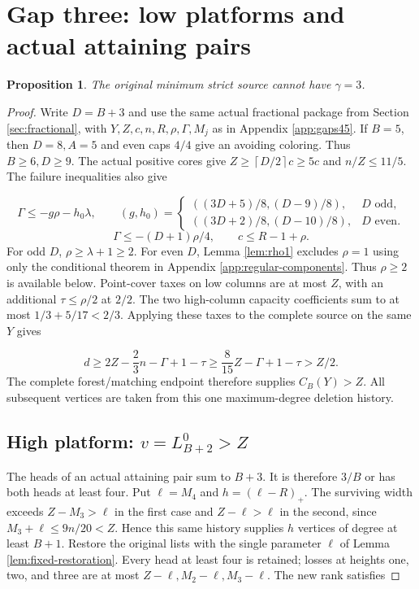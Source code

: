 \documentclass[11pt,a4paper]{article}
\newcommand{\ceil}[1]{\left\lceil#1\right\rceil}
\newtheorem{proposition}[theorem]{Proposition}
\theoremstyle{definition}
\begin{document}
\section{Gap three: low platforms and actual attaining pairs}\label{app:gap3}
\begin{proposition}\label{prop:gap3}
The original minimum strict source cannot have $\gamma=3$.
\end{proposition}
\begin{proof}
Write $D=B+3$ and use the same actual fractional package from
Section \ref{sec:fractional}, with $Y,Z,c,n,R,\rho,\Gamma,M_j$
as in Appendix \ref{app:gaps45}.
If $B=5$, then $D=8,A=5$ and even caps $4/4$ give an avoiding coloring.
Thus $B\ge6,D\ge9$.
The actual positive cores give $Z\ge\ceil{D/2}c\ge5c$ and $n/Z\le11/5$.
The failure inequalities also give

\begin{equation}\label{eq:gap3-debt}
\Gamma\le-g\rho-h_0\lambda,\qquad
(g,h_0)=
\begin{cases}
((3D+5)/8,(D-9)/8),&D\text{ odd},\\
((3D+2)/8,(D-10)/8),&D\text{ even}.
\end{cases}
\end{equation}
\[
\Gamma\le-(D+1)\rho/4,\qquad c\le R-1+\rho.
\]
For odd $D$, $\rho\ge\lambda+1\ge2$.
For even $D$, Lemma \ref{lem:rho1} excludes $\rho=1$ using only the
conditional theorem in Appendix \ref{app:regular-components}.
Thus $\rho\ge2$ is available below.
Point-cover taxes on low columns are at most $Z$, with an additional
$\tau\le\rho/2$ at $2/2$.
The two high-column capacity coefficients sum to at most
$1/3+5/17<2/3$. Applying these taxes to the complete source on the same $Y$ gives

\[
d\ge2Z-\frac23n-\Gamma+1-\tau
\ge\frac8{15}Z-\Gamma+1-\tau>Z/2.
\]
The complete forest/matching endpoint therefore supplies $C_B(Y)>Z$.
All subsequent vertices are taken from this one maximum-degree deletion history.

\subsection*{High platform: $v=L_{B+2}^0>Z$}
The heads of an actual attaining pair sum to $B+3$.
It is therefore $3/B$ or has both heads at least four.
Put $\ell=M_4$ and $h=(\ell-R)_+$.
The surviving width exceeds $Z-M_3>\ell$ in the first case and
$Z-\ell>\ell$ in the second, since $M_3+\ell\le9n/20<Z$.
Hence this same history supplies $h$ vertices of degree at least $B+1$.
Restore the original lists with the single parameter $\ell$
of Lemma \ref{lem:fixed-restoration}.
Every head at least four is retained; losses at heights one, two, and three
are at most $Z-\ell,M_2-\ell,M_3-\ell$. The new rank satisfies


\end{proof}
\end{document}
